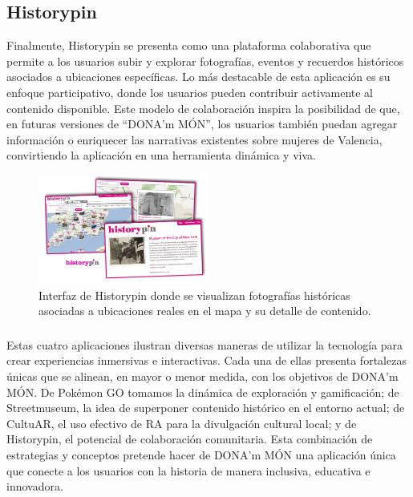 \subsection{Historypin}

Finalmente, Historypin se presenta como una plataforma colaborativa que permite a los usuarios subir y explorar fotografías, eventos y recuerdos históricos asociados a ubicaciones específicas. Lo más destacable de esta aplicación es su enfoque participativo, donde los usuarios pueden contribuir activamente al contenido disponible. Este modelo de colaboración inspira la posibilidad de que, en futuras versiones de “DONA’m MÓN”, los usuarios también puedan agregar información o enriquecer las narrativas existentes sobre mujeres de Valencia, convirtiendo la aplicación en una herramienta dinámica y viva.

\begin{figure}[H]
    \centering
    \includegraphics[width=0.5\textwidth]{figs/history-pin.png}
    \caption{Interfaz de Historypin donde se visualizan fotografías históricas asociadas a ubicaciones reales en el mapa y su detalle de contenido.}
    \label{fig:historypin}
\end{figure}
\subsubsection{}

Estas cuatro aplicaciones ilustran diversas maneras de utilizar la tecnología para crear experiencias inmersivas e interactivas. Cada una de ellas presenta fortalezas únicas que se alinean, en mayor o menor medida, con los objetivos de DONA'm MÓN. De Pokémon GO tomamos la dinámica de exploración y gamificación; de Streetmuseum, la idea de superponer contenido histórico en el entorno actual; de CultuAR, el uso efectivo de RA para la divulgación cultural local; y de Historypin, el potencial de colaboración comunitaria. Esta combinación de estrategias y conceptos pretende hacer de DONA'm MÓN una aplicación única que conecte a los usuarios con la historia de manera inclusiva, educativa e innovadora.



